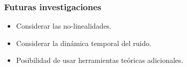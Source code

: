\documentclass[xcolor=dvipsnames]{beamer}
\begin{document}
\begin{frame}
\frametitle{Futuras investigaciones}
\begin{itemize}

\item Considerar las no-linealidades.
\item Considerar la din\'amica temporal del ruido.
\item Posibilidad de usar herramientas te\'oricas adicionales.

\end{itemize}
\end{frame}





\begin{frame}[allowframebreaks]
\printbibliography
\end{frame}
\end{document}
